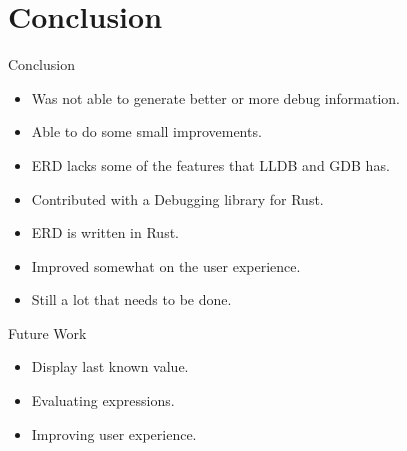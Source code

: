 \section{Conclusion}

\begin{frame}{Conclusion}
    \begin{itemize}
	\item Was not able to generate better or more debug information.
        \item Able to do some small improvements.
        \item ERD lacks some of the features that LLDB and GDB has.
        \item Contributed with a Debugging library for Rust.
        \item ERD is written in Rust.
        \item Improved somewhat on the user experience.
        \item Still a lot that needs to be done.
    \end{itemize}
\end{frame}


\begin{frame}{Future Work}
    \begin{itemize}
        \item Display last known value.
        \item Evaluating expressions.
	\item Improving user experience.
    \end{itemize}
\end{frame}


